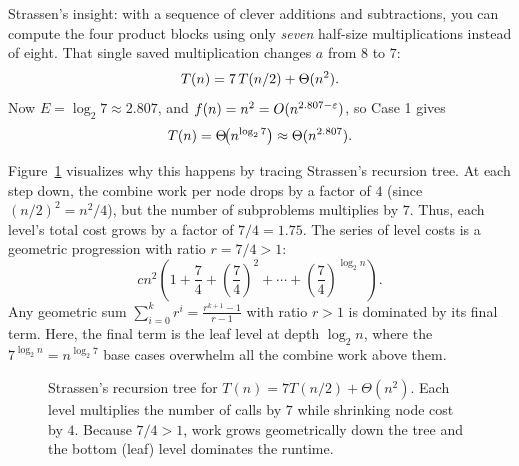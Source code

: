Strassen's insight: with a sequence of clever additions and subtractions, you can
compute the four product blocks using only \emph{seven} half-size
multiplications instead of eight. That single saved multiplication changes $a$
from $8$ to $7$:
\[T(n) = 7\,T(n/2) + \Theta(n^2).\]
Now $E=\log_2 7 \approx 2.807$, and $f(n)=n^2 = O(n^{2.807-\varepsilon})$, so Case 1 gives
\[T(n) = \Theta\!\big(n^{\log_2 7}\big) \approx \Theta(n^{2.807}).\]

Figure~\ref{ch04:strassen-tree} visualizes why this happens by tracing Strassen's
recursion tree. At each step down, the combine work per node drops by a factor of
$4$ (since $(n/2)^2 = n^2/4$), but the number of subproblems multiplies by $7$.
Thus, each level's total cost grows by a factor of $7/4 = 1.75$. The series of level
costs is a geometric progression with ratio $r = 7/4 > 1$:
\[
cn^2 \left( 1 + \frac{7}{4} + \left(\frac{7}{4}\right)^2 + \cdots + \left(\frac{7}{4}\right)^{\log_2 n} \right).
\]
Any geometric sum $\sum_{i=0}^k r^i = \frac{r^{k+1}-1}{r-1}$ with ratio $r > 1$ is
dominated by its final term. Here, the final term is the leaf level at depth
$\log_2 n$, where the $7^{\log_2 n} = n^{\log_2 7}$ base cases overwhelm all the
combine work above them.

\begin{figure}[H]
\centering
{}
\caption{Strassen's recursion tree for $T(n) = 7T(n/2) + \Theta(n^2)$. Each level multiplies
the number of calls by $7$ while shrinking node cost by $4$. Because $7/4 > 1$, work
grows geometrically down the tree and the bottom (leaf) level dominates the runtime.}
\label{ch04:strassen-tree}
\end{figure}

